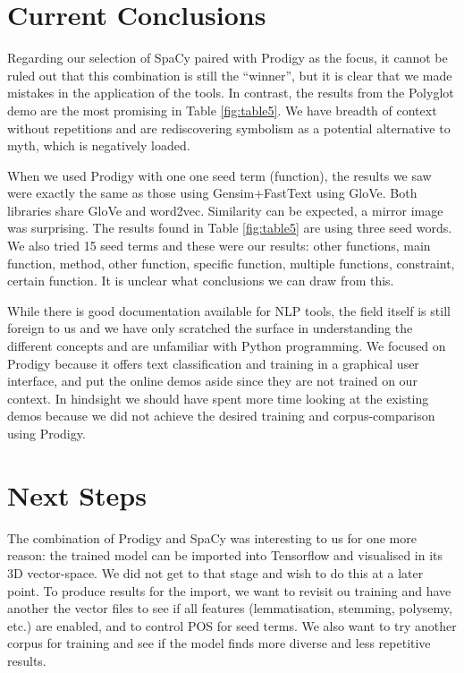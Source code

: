 \documentclass[12pt, usenames, dvipsnames]{report}
\begin{document}
\begin{flushleft}

\section{Current Conclusions}

Regarding our selection of SpaCy paired with Prodigy as the focus, it cannot be ruled out that this combination is still the “winner”, but it is clear that we made mistakes in the application of the tools.
In contrast, the results from the Polyglot demo are the most promising in Table \ref{fig:table5}. 
We have breadth of context without repetitions and are rediscovering symbolism as a potential alternative to myth, which is negatively loaded.

When we used Prodigy with one one seed term (function), the results we saw were exactly the same as those using Gensim+FastText using GloVe.
Both libraries share GloVe and word2vec. Similarity can be expected, a mirror image was surprising.
The results found in Table \ref{fig:table5} are using three seed words.
We also tried 15 seed terms and these were our results: other functions, main function, method, other function, specific function, multiple functions, constraint, certain function.
It is unclear what conclusions we can draw from this.

While there is good documentation available for NLP tools, the field itself is still foreign to us and we have only scratched the surface in understanding the different concepts and are unfamiliar with Python programming.
We focused on Prodigy because it offers text classification and training in a graphical user interface, and put the online demos aside since they are not trained on our context.
In hindsight we should have spent more time looking at the existing demos because we did not achieve the desired training and corpus-comparison using Prodigy.


\section{Next Steps}

The combination of Prodigy and SpaCy was interesting to us for one more reason: the trained model can be imported into Tensorflow and visualised in its 3D vector-space.
We did not get to that stage and wish to do this at a later point.
To produce results for the import, we want to revisit ou training and have another the vector files to see if all features (lemmatisation, stemming, polysemy, etc.) are enabled, and to control POS for seed terms.
We also want to try another corpus for training and see if the model finds more diverse and less repetitive results.


\end{flushleft}
\end{document}
